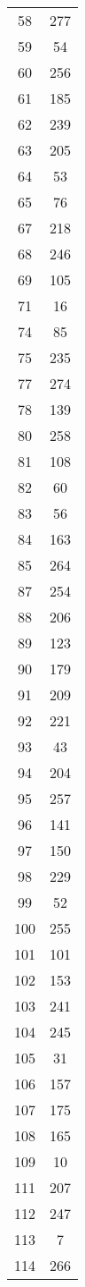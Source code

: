 \documentclass[10pt,letterpaper]{article}\usepackage[]{graphicx}\usepackage[]{color}
\begin{document}
\begin{center}
\begin{longtable}[c]{cc}
		58 & 277 \\
		59 & 54 \\
		60 & 256 \\
		61 & 185 \\
		62 & 239 \\
		63 & 205 \\
		64 & 53 \\
		65 & 76 \\
		67 & 218 \\
		68 & 246 \\
		69 & 105 \\
		71 & 16 \\
		74 & 85 \\
		75 & 235 \\
		77 & 274 \\
		78 & 139 \\
		80 & 258 \\
		81 & 108 \\
		82 & 60 \\
		83 & 56 \\
		84 & 163 \\
		85 & 264 \\
		87 & 254 \\
		88 & 206 \\
		89 & 123 \\
		90 & 179 \\
		91 & 209 \\
		92 & 221 \\
		93 & 43 \\
		94 & 204 \\
		95 & 257 \\
		96 & 141 \\
		97 & 150 \\
		98 & 229 \\
		99 & 52 \\
		100 & 255 \\
		101	& 101 \\
		102	& 153 \\
		103	& 241 \\
		104	& 245 \\
		105	& 31 \\
		106	& 157 \\
		107	& 175 \\
		108	& 165 \\
		109	& 10 \\
		111	& 207 \\
		112	& 247 \\
		113	& 7 \\
		114	& 266 \\

\end{longtable}
\end{center}
\end{document}
